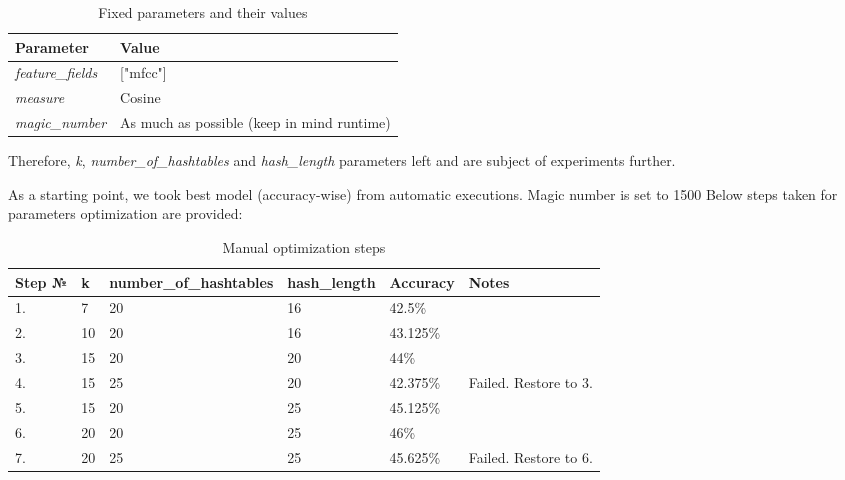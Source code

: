 \documentclass[11pt]{article}
\begin{document}
\begin{table*}[htb]
\begin{center}
\begin{tabular}{|l|l|}
\hline
\textbf{Parameter}              & \textbf{Value}                                                      
\\ \hline
\textit{feature\_fields}        & ["mfcc"]                 
\\ \hline
\textit{measure}                & Cosine 
\\ \hline
\textit{magic\_number}          & As much as possible (keep in mind runtime)
\\ \hline
\end{tabular}
\caption{Fixed parameters and their values}
\end{center}
\end{table*}

Therefore, \textit{k}, \textit{number\_of\_hashtables} and \textit{hash\_length} parameters left and are subject of experiments further.

As a starting point, we took best model (accuracy-wise) from automatic executions. Magic number is set to 1500
Below steps taken for parameters optimization are provided:

\begin{table*}[htb]
\begin{center}
\begin{tabular}{|l|l|l|l|l|l}
\hline
\textbf{Step №} & \textbf{k} & \textbf{number\_of\_hashtables} & \textbf{hash\_length} & \textbf{Accuracy} & \textbf{Notes}      
\\ \hline
1.              & 7          & 20                              & 16                    & 42.5\%            &             
\\ \hline
2.              & 10         & 20                              & 16                    & 43.125\%          &            
\\ \hline
3.              & 15         & 20                              & 20                    & 44\%              &       
\\ \hline
4.              & 15         & 25                              & 20                    & 42.375\%          & Failed. Restore to 3.     
\\ \hline
5.              & 15         & 20                              & 25                    & 45.125\%          &       
\\ \hline
6.              & 20         & 20                              & 25                    & 46\%              &       
\\ \hline
7.              & 20         & 25                              & 25                    & 45.625\%          & Failed. Restore to 6.    
\\ \hline

\end{tabular}%
\caption{Manual optimization steps}
\end{center}
\end{table*}
\end{document}
